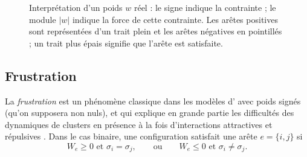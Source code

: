 \begin{figure}[H]
\centering
{}
\caption{Interprétation d'un poids $w$ réel : le signe indique la contrainte ; le module $|w|$ indique la force de cette contrainte. Les arêtes positives sont représentées d'un trait plein et les arêtes négatives en pointillés ; un trait plus épais signifie que l'arête est satisfaite.}
\label{fig:chapII_signed_weight}
\end{figure}

\subsection{Frustration}

La \emph{frustration} \cite{FaiblesseSwendsen-WangFrustration} est un phénomène classique dans les modèles d' avec poids signés \cite{Nishimori2026Mapping} (qu'on supposera non nuls), et qui explique en grande partie les difficultés des dynamiques de clusters en présence à la fois d'interactions attractives et répulsives \cite{KBD1992, FaiblesseSwendsen-WangFrustration}. Dans le cas binaire, une configuration satisfait une arête $e=\{i,j\}$ si
\[
    W_e\ge0\text{ et }\sigma_i=\sigma_j,
    \qquad\text{ou}\qquad
    W_e\le0\text{ et }\sigma_i\neq\sigma_j.
\]


